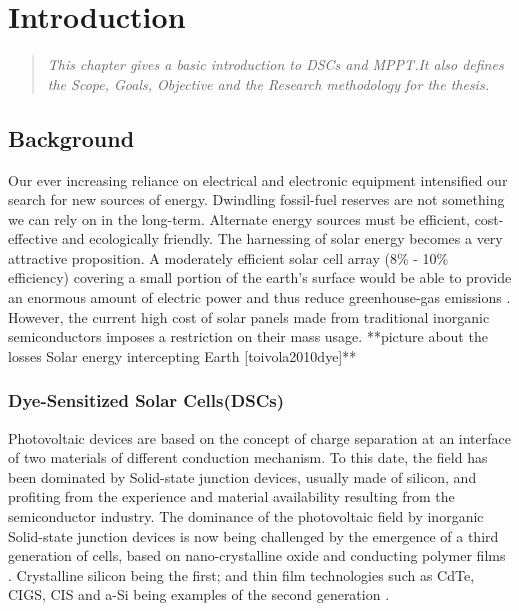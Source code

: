 \chapter{Introduction}
\begin{quote} 
\it This chapter gives a basic introduction to  \ac{DSCs} and \ac{MPPT}.It also defines the Scope, Goals, Objective and the Research methodology for the thesis.
\end{quote}

\section{Background}

Our ever increasing reliance on electrical and electronic equipment intensified our search for new sources of energy. Dwindling fossil-fuel reserves are not something we can rely on in the long-term. Alternate energy sources must be efficient, cost-effective and ecologically friendly. The harnessing of solar energy becomes a very attractive proposition. A moderately efficient solar cell array (8\% - 10\% efficiency) covering a small portion of the earth's surface would be able to provide an enormous amount of electric power and thus reduce greenhouse-gas emissions \cite{kalyanasundaram2010dye}. However, the current high cost of solar panels made from traditional inorganic semiconductors imposes a restriction on their mass usage.
 **picture about the losses  Solar energy intercepting Earth [toivola2010dye]**
 
 \subsection{Dye-Sensitized Solar Cells(DSCs)}
  Photovoltaic devices are based on the concept of charge separation at an interface of two materials of different conduction mechanism. To this date, the field has been dominated by Solid-state junction devices, usually made of silicon, and profiting from the experience and material availability resulting from the semiconductor industry. The dominance of the photovoltaic field by inorganic Solid-state junction devices is now being challenged by the emergence of a third generation of cells, based on nano-crystalline oxide and conducting polymer films \cite{gratzel2004conversion}. Crystalline silicon being the first; and thin film technologies such as \ac{CdTe}, \ac{CIGS}, \ac{CIS} and \ac{a-Si} being examples of the second generation \cite{toivola2010dye}.\\
  
